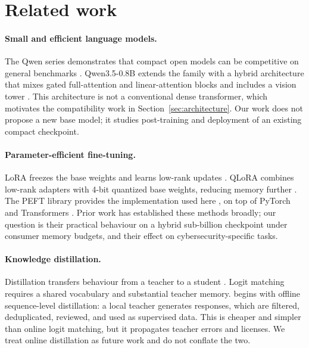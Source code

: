 \section{Related work}
\label{sec:related}

\paragraph{Small and efficient language models.}
The Qwen series demonstrates that compact open models can be competitive on
general benchmarks \citep{qwen3_2025,qwen25coder}. Qwen3.5-0.8B extends the
family with a hybrid architecture that mixes gated full-attention and
linear-attention blocks and includes a vision tower
\citep{qwen35_model_card}. This architecture is not a conventional dense
transformer, which motivates the compatibility work in
Section~\ref{sec:architecture}. Our work does not propose a new base model; it
studies post-training and deployment of an existing compact checkpoint.

\paragraph{Parameter-efficient fine-tuning.}
LoRA freezes the base weights and learns low-rank updates
\citep{hu2021lora}. QLoRA combines low-rank adapters with 4-bit quantized base
weights, reducing memory further \citep{dettmers2023qlora}. The PEFT library
provides the implementation used here \citep{peft2022}, on top of PyTorch
\citep{paszke2019pytorch} and Transformers \citep{wolf2020transformers}. Prior
work has established these methods broadly; our question is their practical
behaviour on a hybrid sub-billion checkpoint under consumer memory budgets, and
their effect on cybersecurity-specific tasks.

\paragraph{Knowledge distillation.}
Distillation transfers behaviour from a teacher to a student
\citep{hinton2015distillation}. Logit matching requires a shared vocabulary and
substantial teacher memory. \cyberlite{} begins with offline sequence-level
distillation: a local teacher generates responses, which are filtered,
deduplicated, reviewed, and used as supervised data. This is cheaper and simpler
than online logit matching, but it propagates teacher errors and licenses. We
treat online distillation as future work and do not conflate the two.

